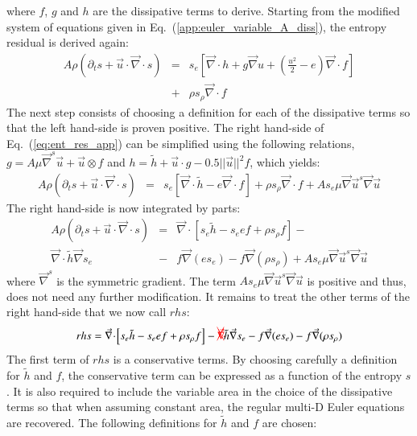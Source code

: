 \documentclass[preprint,10pt]{elsarticle}
\renewcommand{\div}{\vec{\nabla}\! \cdot \!}
\newcommand{\grad}{\vec{\nabla}}
\newcommand{\eqt}[1]{Eq.~(\ref{#1})}                     %
\newcommand{\tcr}[1]{\textcolor{red}{#1}}
\begin{document}
where $f$, $g$ and $h$ are the dissipative terms to derive. Starting from the modified system of equations given in \eqt{app:euler_variable_A_diss}, the entropy residual is derived again:
\begin{eqnarray}
\label{eq:ent_res_app}
A \rho \left( \partial_t s + \vec{u} \cdot \div s \right) &=& s_e \left[ \div h + g \grad u + \left( \frac{u^2}{2}-e \right) \div f \right] \nonumber\\
&+& \rho s_{\rho} \div f
\end{eqnarray}
The next step consists of choosing a definition for each of the dissipative terms so that the left hand-side is proven positive. The right hand-side of \eqt{eq:ent_res_app} can be simplified using the following relations, $g = A \mu \grad^s \vec{u} + \vec{u} \otimes f$ and $h = \tilde{h} + \vec{u} \cdot g - 0.5 || \vec{u} ||^2 f$, which yields:
\begin{eqnarray}
\label{eq:ent_res_app2}
A \rho \left( \partial_t s + \vec{u} \cdot \div s \right) &=& s_e \left[ \div \tilde{h}-e \div f \right] + \rho s_{\rho} \div f  + A s_e \mu \grad \vec{u}^s \grad \vec{u}\nonumber
\end{eqnarray}
The right hand-side is now integrated by parts:
\begin{eqnarray}
\label{eq:ent_res_app3}
A \rho \left( \partial_t s + \vec{u} \cdot \div s \right) &=& \div \left[ s_e \tilde{h}-s_e e f  + \rho s_{\rho} f \right] -\nonumber \\
\div \tilde{h} \grad s_e  &-& f \grad (e s_e) -  f \grad ( \rho s_{\rho} ) + A s_e \mu \grad \vec{u}^s \grad \vec{u} \nonumber
\end{eqnarray}
where $\grad^s$ is the symmetric gradient. The term $A s_e \mu \grad \vec{u}^s \grad \vec{u}$ is positive and thus, does not need any further modification. It remains to treat the other terms of the right hand-side that we now call $rhs$:
\begin{equation}
rhs = \div \left[ s_e \tilde{h}-s_e e f  + \rho s_{\rho} f \right] - \tcr{\xcancel{\div}} \tilde{h} \grad s_e  - f \grad (e s_e) - f \grad ( \rho s_{\rho} ) \nonumber
\end{equation}
The first term of $rhs$ is a conservative terms. By choosing carefully a definition for $\tilde{h}$ and $f$, the conservative term can be expressed as a function of the entropy $s$. It is also required to include the variable area in the choice of the dissipative terms so that when assuming constant area, the regular multi-D Euler equations are recovered. The following definitions for $\tilde{h}$ and $f$ are chosen:
\end{document}
